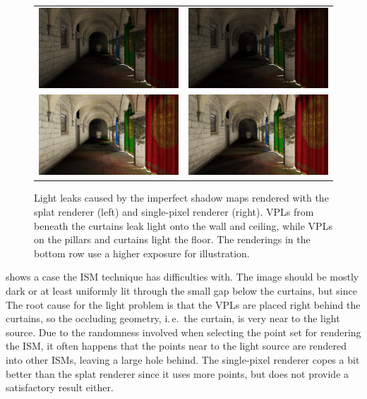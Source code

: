  \begin{figure}[htb]
 \centering
   \begin{tabular}{@{}cc@{}}
     \includegraphics[width=.22\textwidth]{../screenshots/leaks_splat} &
     \includegraphics[width=.22\textwidth]{../screenshots/leaks_single_pixel}\\
     \includegraphics[width=.22\textwidth]{../screenshots/leaks_splat_exposure} &
     \includegraphics[width=.22\textwidth]{../screenshots/leaks_single_pixel_exposure}
   \end{tabular}
   \caption{Light leaks caused by the imperfect shadow maps rendered with the splat renderer (left) and single-pixel renderer (right). VPLs from beneath the curtains leak light onto the wall and ceiling, while VPLs on the pillars and curtains light the floor. The renderings in the bottom row use a higher exposure for illustration. }
   \label{fig:results:leaks}
 \end{figure}


  shows a case the ISM technique has difficulties with. The image should be mostly dark or at least uniformly lit through the small gap below the curtains, but  since The root cause for the light problem is that the VPLs are placed right behind the curtains, so the occluding geometry, i.\,e.\ the curtain, is very near to the light source. Due to the randomness involved when selecting the point set for rendering the ISM, it often happens that the points near to the light source are rendered into other ISMs, leaving a large hole behind. The single-pixel renderer copes a bit better than the splat renderer since it uses more points, but does not provide a satisfactory result either.



